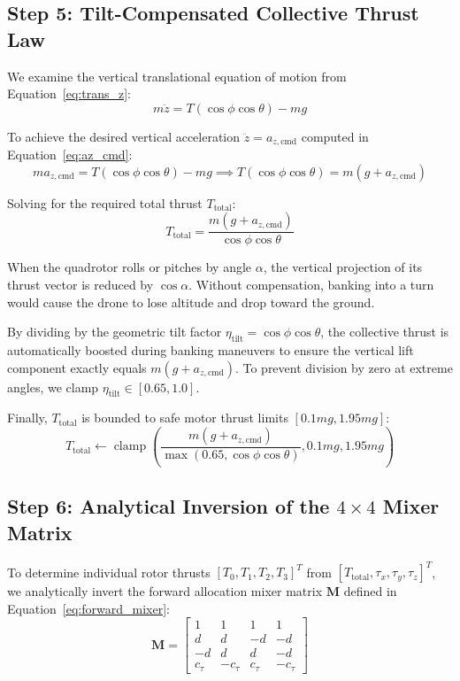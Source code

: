 \documentclass[11pt,a4paper]{article}
\begin{document}
\subsection{Step 5: Tilt-Compensated Collective Thrust Law}
We examine the vertical translational equation of motion from Equation~\eqref{eq:trans_z}:
\begin{equation}
m \ddot{z} = T (\cos\phi \cos\theta) - mg
\end{equation}

To achieve the desired vertical acceleration $\ddot{z} = a_{z,\mathrm{cmd}}$ computed in Equation~\eqref{eq:az_cmd}:
\begin{equation}
m a_{z,\mathrm{cmd}} = T (\cos\phi \cos\theta) - mg \implies T (\cos\phi \cos\theta) = m (g + a_{z,\mathrm{cmd}})
\end{equation}

Solving for the required total thrust $T_{\mathrm{total}}$:
\begin{equation}
T_{\mathrm{total}} = \frac{m (g + a_{z,\mathrm{cmd}})}{\cos\phi \cos\theta}
\label{eq:tilt_comp_thrust}
\end{equation}

\begin{tcolorbox}[title=Geometric Significance of Tilt Compensation]
When the quadrotor rolls or pitches by angle $\alpha$, the vertical projection of its thrust vector is reduced by $\cos\alpha$. Without compensation, banking into a turn would cause the drone to lose altitude and drop toward the ground. 

By dividing by the geometric tilt factor $\eta_{\mathrm{tilt}} = \cos\phi \cos\theta$, the collective thrust is automatically boosted during banking maneuvers to ensure the vertical lift component exactly equals $m(g + a_{z,\mathrm{cmd}})$. To prevent division by zero at extreme angles, we clamp $\eta_{\mathrm{tilt}} \in [0.65, 1.0]$.
\end{tcolorbox}

Finally, $T_{\mathrm{total}}$ is bounded to safe motor thrust limits $[0.1 mg, 1.95 mg]$:
\begin{equation}
T_{\mathrm{total}} \leftarrow \operatorname{clamp}\left( \frac{m(g + a_{z,\mathrm{cmd}})}{\max(0.65, \cos\phi \cos\theta)}, 0.1 mg, 1.95 mg \right)
\end{equation}

\subsection{Step 6: Analytical Inversion of the \texorpdfstring{$4 \times 4$}{4x4} Mixer Matrix}
To determine individual rotor thrusts $[T_0, T_1, T_2, T_3]^T$ from $[T_{\mathrm{total}}, \tau_x, \tau_y, \tau_z]^T$, we analytically invert the forward allocation mixer matrix $\mathbf{M}$ defined in Equation~\eqref{eq:forward_mixer}:
\begin{equation}
\mathbf{M} = \begin{bmatrix}
1 & 1 & 1 & 1 \\
d & d & -d & -d \\
-d & d & d & -d \\
c_\tau & -c_\tau & c_\tau & -c_\tau
\end{bmatrix}
\end{equation}
\end{document}
